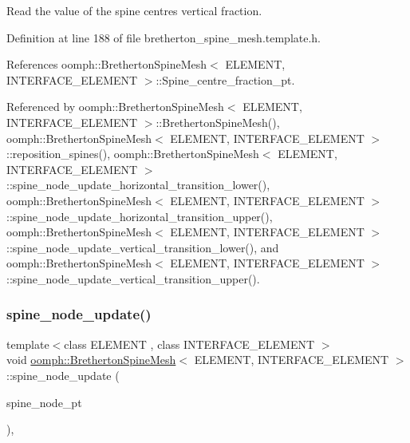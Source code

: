 Read the value of the spine centre\textquotesingle{}s vertical fraction. 



Definition at line 188 of file bretherton\+\_\+spine\+\_\+mesh.\+template.\+h.



References oomph\+::\+Bretherton\+Spine\+Mesh$<$ E\+L\+E\+M\+E\+N\+T, I\+N\+T\+E\+R\+F\+A\+C\+E\+\_\+\+E\+L\+E\+M\+E\+N\+T $>$\+::\+Spine\+\_\+centre\+\_\+fraction\+\_\+pt.



Referenced by oomph\+::\+Bretherton\+Spine\+Mesh$<$ E\+L\+E\+M\+E\+N\+T, I\+N\+T\+E\+R\+F\+A\+C\+E\+\_\+\+E\+L\+E\+M\+E\+N\+T $>$\+::\+Bretherton\+Spine\+Mesh(), oomph\+::\+Bretherton\+Spine\+Mesh$<$ E\+L\+E\+M\+E\+N\+T, I\+N\+T\+E\+R\+F\+A\+C\+E\+\_\+\+E\+L\+E\+M\+E\+N\+T $>$\+::reposition\+\_\+spines(), oomph\+::\+Bretherton\+Spine\+Mesh$<$ E\+L\+E\+M\+E\+N\+T, I\+N\+T\+E\+R\+F\+A\+C\+E\+\_\+\+E\+L\+E\+M\+E\+N\+T $>$\+::spine\+\_\+node\+\_\+update\+\_\+horizontal\+\_\+transition\+\_\+lower(), oomph\+::\+Bretherton\+Spine\+Mesh$<$ E\+L\+E\+M\+E\+N\+T, I\+N\+T\+E\+R\+F\+A\+C\+E\+\_\+\+E\+L\+E\+M\+E\+N\+T $>$\+::spine\+\_\+node\+\_\+update\+\_\+horizontal\+\_\+transition\+\_\+upper(), oomph\+::\+Bretherton\+Spine\+Mesh$<$ E\+L\+E\+M\+E\+N\+T, I\+N\+T\+E\+R\+F\+A\+C\+E\+\_\+\+E\+L\+E\+M\+E\+N\+T $>$\+::spine\+\_\+node\+\_\+update\+\_\+vertical\+\_\+transition\+\_\+lower(), and oomph\+::\+Bretherton\+Spine\+Mesh$<$ E\+L\+E\+M\+E\+N\+T, I\+N\+T\+E\+R\+F\+A\+C\+E\+\_\+\+E\+L\+E\+M\+E\+N\+T $>$\+::spine\+\_\+node\+\_\+update\+\_\+vertical\+\_\+transition\+\_\+upper().

\mbox{\label{classoomph_1_1BrethertonSpineMesh_a981301706d4940cfb24d3d769a7a523b}} 
\subsubsection{\texorpdfstring{spine\+\_\+node\+\_\+update()}{spine\_node\_update()}}
{\footnotesize\ttfamily template$<$class E\+L\+E\+M\+E\+NT , class I\+N\+T\+E\+R\+F\+A\+C\+E\+\_\+\+E\+L\+E\+M\+E\+NT $>$ \\
void \hyperlink{classoomph_1_1BrethertonSpineMesh}{oomph\+::\+Bretherton\+Spine\+Mesh}$<$ E\+L\+E\+M\+E\+NT, I\+N\+T\+E\+R\+F\+A\+C\+E\+\_\+\+E\+L\+E\+M\+E\+NT $>$\+::spine\+\_\+node\+\_\+update (\begin{DoxyParamCaption}\item[{\hyperlink{classoomph_1_1SpineNode}{Spine\+Node} $\ast$}]{spine\+\_\+node\+\_\+pt }\end{DoxyParamCaption})\hspace{0.3cm}{\ttfamily [inline]}, {\ttfamily [virtual]}}



